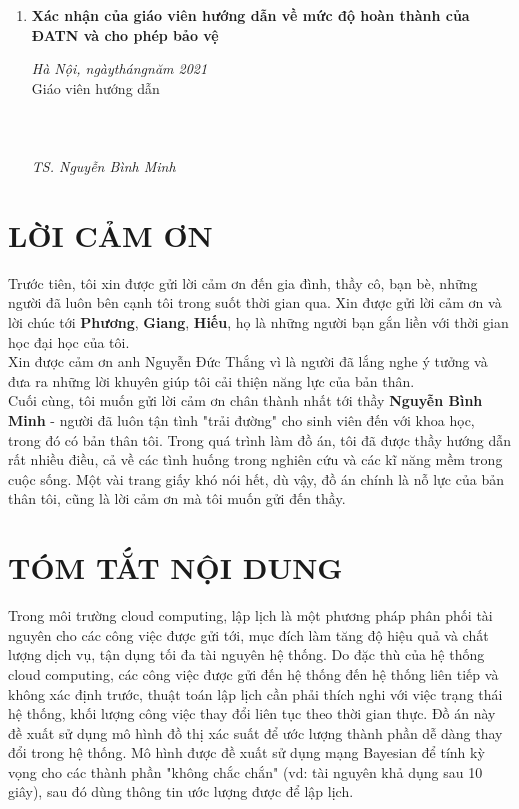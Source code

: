 \documentclass{my_style}
\begin{document}
\begin{enumerate}
\item \textbf{Xác nhận của giáo viên hướng dẫn về mức độ hoàn thành của ĐATN và cho phép bảo vệ }\\
\begin{adjustwidth}{200pt}{}
\begin{center}
\textit{Hà Nội, ngày\qquad tháng\qquad năm 2021}\\
Giáo viên hướng dẫn\\ 
\leavevmode\\
\leavevmode\\
\leavevmode\\
\textit{TS. Nguyễn Bình Minh}
\end{center}
\end{adjustwidth} 
\end{enumerate}

\newpage	
\section*{LỜI CẢM ƠN}	
Trước tiên, tôi xin được gửi lời cảm ơn đến gia đình, thầy cô, bạn bè, những người đã luôn bên cạnh tôi trong suốt thời gian qua. Xin được gửi lời cảm ơn và lời chúc tới \textbf{Phương}, \textbf{Giang}, \textbf{Hiếu}, họ là những người bạn gắn liền với thời gian học đại học của tôi.\\
Xin được cảm ơn anh Nguyễn Đức Thắng vì là người đã lắng nghe ý tưởng và đưa ra những lời khuyên giúp tôi cải thiện năng lực của bản thân.\\
Cuối cùng, tôi muốn gửi lời cảm ơn chân thành nhất tới thầy \textbf{Nguyễn Bình Minh} - người đã luôn tận tình "trải đường" cho sinh viên đến với khoa học, trong đó có bản thân tôi. Trong quá trình làm đồ án, tôi đã được thầy hướng dẫn rất nhiều điều, cả về các tình huống trong nghiên cứu và các kĩ năng mềm trong cuộc sống. Một vài trang giấy khó nói hết, dù vậy, đồ án chính là nỗ lực của bản thân tôi, cũng là lời cảm ơn mà tôi muốn gửi đến thầy. 

\section*{TÓM TẮT NỘI DUNG}
Trong môi trường cloud computing, lập lịch là một phương pháp phân phối tài nguyên cho các công việc được gửi tới, mục đích làm tăng độ hiệu quả và chất lượng dịch vụ, tận dụng tối đa tài nguyên hệ thống. Do đặc thù của hệ thống cloud computing, các công việc được gửi đến hệ thống đến hệ thống liên tiếp và không xác định trước, thuật toán lập lịch cần phải thích nghi với việc trạng thái hệ thống, khối lượng công việc thay đổi liên tục theo thời gian thực. Đồ án này đề xuất sử dụng mô hình đồ thị xác suất để ước lượng thành phần dễ dàng thay đổi trong hệ thống. Mô hình được đề xuất sử dụng mạng Bayesian để tính kỳ vọng cho các thành phần "không chắc chắn" (vd: tài nguyên khả dụng sau 10 giây), sau đó dùng thông tin ước lượng được để lập lịch. 
\end{document}
